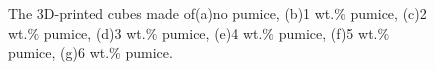 \begin{figure}[htbp]
{\begin{minipage}[t]{0.35\textwidth}
		\end{minipage}
	}
 
  \caption[The 3D-printed cubes]{\footnotesize The 3D-printed cubes made of(a)no pumice, (b)1 wt.$\%$ pumice, (c)2 wt.$\%$ pumice, (d)3 wt.$\%$ pumice, (e)4 wt.$\%$ pumice, (f)5 wt.$\%$ pumice, (g)6 wt.$\%$ pumice. }
  \label{Fig:cubes}
\end{figure}
